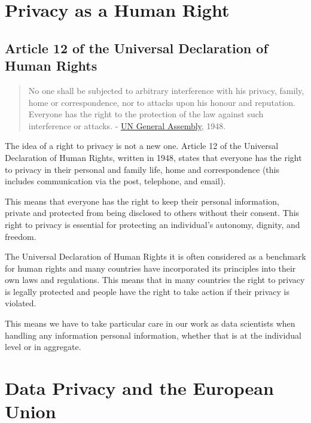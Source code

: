 \documentclass[
  letterpaper,
  DIV=11,
  numbers=noendperiod]{scrreprt}
\begin{document}
\section{Privacy as a Human Right}\label{privacy-as-a-human-right}

\subsection{Article 12 of the Universal Declaration of Human
Rights}\label{article-12-of-the-universal-declaration-of-human-rights}

\begin{quote}
No one shall be subjected to arbitrary interference with his privacy,
family, home or correspondence, nor to attacks upon his honour and
reputation. Everyone has the right to the protection of the law against
such interference or attacks. -
\href{https://www.un.org/en/about-us/universal-declaration-of-human-rights}{UN
General Assembly}, 1948.
\end{quote}

The idea of a right to privacy is not a new one. Article 12 of the
Universal Declaration of Human Rights, written in 1948, states that
everyone has the right to privacy in their personal and family life,
home and correspondence (this includes communication via the post,
telephone, and email).

This means that everyone has the right to keep their personal
information, private and protected from being disclosed to others
without their consent. This right to privacy is essential for protecting
an individual's autonomy, dignity, and freedom.

The Universal Declaration of Human Rights it is often considered as a
benchmark for human rights and many countries have incorporated its
principles into their own laws and regulations. This means that in many
countries the right to privacy is legally protected and people have the
right to take action if their privacy is violated.

This means we have to take particular care in our work as data
scientists when handling any information personal information, whether
that is at the individual level or in aggregate.

\section{Data Privacy and the European
Union}\label{data-privacy-and-the-european-union}
\end{document}
